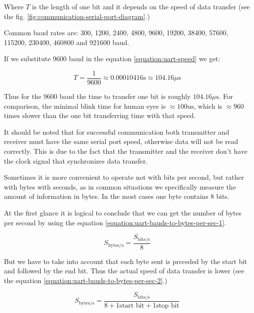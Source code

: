 \documentclass[../sparc.tex]{subfiles}
\begin{document}
Where $T$ is the length of one bit and it depends on the speed of data transfer
(see the fig. \ref{fig:communication-serial-port-diagram}.)

Common baud rates are: 300, 1200, 2400, 4800, 9600, 19200, 38400, 57600, 115200,
230400, 460800 and 921600 baud.

If we substitute 9600 baud in the equation \ref{equation:uart-speed} we get:

\begin{equation}
  T = \frac{1}{9600} \approx 0.00010416 \mbox{s} \approx 104.16 \mu\mbox{s}
\end{equation}

Thus for the 9600 baud the time to transfer one bit is roughly $104.16
\mu\mbox{s}$.  For comparison, the minimal blink time for human eyes is $\approx100
\mbox{us}$\cite{chudler}, which is $\approx960$ times slower than the one bit
transferring time with that speed.

It should be noted that for successful communication both transmitter and
receiver must have the same serial port speed, otherwise data will not be read
correctly.  This is due to the fact that the transmitter and the receiver don't
have the clock signal that synchronizes data transfer.

Sometimes it is more convenient to operate not with bits per second, but rather
with bytes with seconds, as in common situations we specifically measure the
amount of information in bytes.  In the most cases one byte contains 8 bits.

At the first glance it is logical to conclude that we can get the number of
bytes per second by using the equation
\ref{equation:uart-bauds-to-bytes-per-sec-1}.

\begin{equation}
  S_{\mbox{bytes/s}} = \frac{S_{\mbox{bits/s}}}{8}
  \label{equation:uart-bauds-to-bytes-per-sec-1}
\end{equation}

But we have to take into account that each byte sent is preceded by the start
bit and followed by the end bit.  Thus the actual speed of data transfer is
lower (see the equation \ref{equation:uart-bauds-to-bytes-per-sec-2}.)

\begin{equation}
  S_{\mbox{bytes/s}} = \frac{S_{\mbox{bits/s}}}{8 + 1 \mbox{start bit} + 1 \mbox{stop bit}}
  \label{equation:uart-bauds-to-bytes-per-sec-2}
\end{equation}
\end{document}
